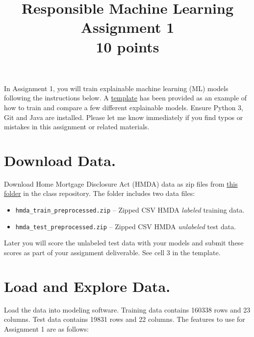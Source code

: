 \documentclass[fleqn]{article}
\title{Responsible Machine Learning\\\Large{Assignment 1}\\\Large{10 points}}
\begin{document}
\maketitle

\noindent In Assignment 1, you will train explainable machine learning (ML) models following the instructions below. A \href{https://nbviewer.jupyter.org/github/jphall663/GWU_rml/blob/master/assignments/assignment_1/assign_1_template.ipynb?flush_cache=true}{template} has been provided as an example of how to train and compare a few different explainable models. Ensure Python 3, Git and Java are installed. Please let me know immediately if you find typos or mistakes in this assignment or related materials. 

\section{Download Data.}

Download Home Mortgage Disclosure Act (HMDA) data as zip files from \href{https://github.com/jphall663/GWU_rml/tree/master/assignments/data}{this folder} in the class repository. The folder includes two data files:

\begin{itemize}
	\item \texttt{hmda\_train\_preprocessed.zip} -- Zipped CSV HMDA \textit{labeled} training data.
	\item \texttt{hmda\_test\_preprocessed.zip} -- Zipped CSV HMDA \textit{unlabeled} test data.
\end{itemize}

\noindent Later you will score the unlabeled test data with your models and submit these scores as part of your assignment deliverable. See cell 3 in the template.

\section{Load and Explore Data.}

Load the data into modeling software. Training data contains 160338 rows and 23 columns. Test data contains 19831 rows and 22 columns. The features to use for Assignment 1 are as follows:
\end{document}
